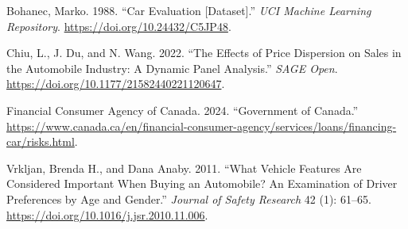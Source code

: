 \documentclass[
  letterpaper,
  DIV=11,
  numbers=noendperiod]{scrartcl}
\newlength{\cslhangindent}
\newenvironment{CSLReferences}[2] %
 {\begin{list}{}{%
  \setlength{\itemindent}{0pt}
  \setlength{\leftmargin}{0pt}
  \setlength{\parsep}{0pt}
  \ifodd #1
   \setlength{\leftmargin}{\cslhangindent}
   \setlength{\itemindent}{-1\cslhangindent}
  \fi
  \setlength{\itemsep}{#2\baselineskip}}}
 {\end{list}}
\begin{document}
\label{refs}
\begin{CSLReferences}{1}{0}
Bohanec, Marko. 1988. {``Car Evaluation {[}Dataset{]}.''} \emph{UCI
Machine Learning Repository}. \url{https://doi.org/10.24432/C5JP48}.

Chiu, L., J. Du, and N. Wang. 2022. {``The Effects of Price Dispersion
on Sales in the Automobile Industry: A Dynamic Panel Analysis.''}
\emph{SAGE Open}. \url{https://doi.org/10.1177/21582440221120647}.

Financial Consumer Agency of Canada. 2024. {``Government of Canada.''}
\url{https://www.canada.ca/en/financial-consumer-agency/services/loans/financing-car/risks.html}.

Vrkljan, Brenda H., and Dana Anaby. 2011. {``What Vehicle Features Are
Considered Important When Buying an Automobile? An Examination of Driver
Preferences by Age and Gender.''} \emph{Journal of Safety Research} 42
(1): 61--65. \url{https://doi.org/10.1016/j.jsr.2010.11.006}.

\end{CSLReferences}
\end{document}
